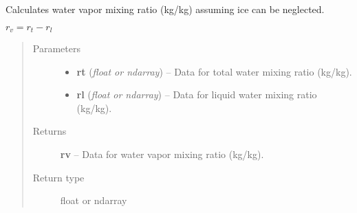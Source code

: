 \documentclass[letterpaper,10pt,english]{sphinxmanual}
\begin{document}

\begin{fulllineitems}
\label{atmos:atmos.equations.rv_from_rt_rl}
Calculates water vapor mixing ratio (kg/kg) assuming ice can be neglected.

\(r_v = r_t-r_l\)
\begin{quote}\begin{description}
\item[{Parameters}] \leavevmode\begin{itemize}
\item {} 
\textbf{rt} (\emph{float or ndarray}) -- Data for total water mixing ratio (kg/kg).

\item {} 
\textbf{rl} (\emph{float or ndarray}) -- Data for liquid water mixing ratio (kg/kg).

\end{itemize}

\item[{Returns}] \leavevmode
\textbf{rv} --
Data for water vapor mixing ratio (kg/kg).

\item[{Return type}] \leavevmode
float or ndarray

\end{description}\end{quote}

\end{fulllineitems}

\end{document}
